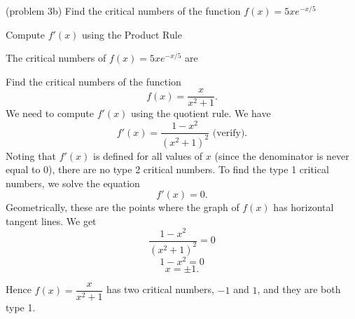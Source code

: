 \documentclass{ximera}
\begin{document}
\begin{problem}(problem 3b)
  Find the critical numbers of the function $f(x) = 5xe^{-x/5}$
  
  
    \begin{hint}
      Compute $f'(x)$ using the Product Rule
    \end{hint}
 
		The critical numbers of $f(x) = 5xe^{-x/5}$ are
		 \begin{multipleChoice}
		\end{multipleChoice} 
		
\end{problem}




\begin{example}[example 4] Find the critical numbers of the function 
\[f(x) = \dfrac{x}{x^2 +1}.\]
We need to compute $f'(x)$ using the quotient rule.  We have
\[f'(x) = \frac{1-x^2}{(x^2+1)^2} \mbox{   (verify)}.\]
Noting that $f'(x)$ is defined for all values of $x$ (since the denominator is never equal to 0), 
there are no type 2 critical numbers.
To find the type 1 critical numbers, we solve the equation
\[f'(x) = 0.\]
Geometrically, these are the points where the graph of $f(x)$ has horizontal tangent lines.
We get
\[ \frac{1-x^2}{(x^2+1)^2} =0\]
\[ 1-x^2 =0\]
\[x = \pm 1.\]

Hence $f(x) = \dfrac{x}{x^2 +1}$ has two critical numbers, $-1$ and $1$, and they are both type 1. 

\begin{image}
\end{image}

\end{example}
\end{document}
